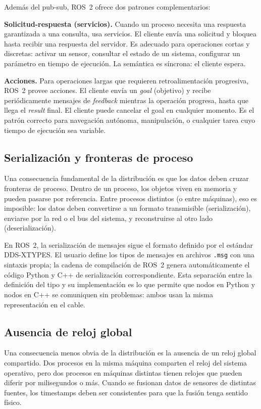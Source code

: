 Además del pub-sub, ROS~2 ofrece dos patrones complementarios:

\textbf{Solicitud-respuesta (servicios).} Cuando un proceso necesita una respuesta garantizada a una consulta, usa servicios. El cliente envía una solicitud y bloquea hasta recibir una respuesta del servidor. Es adecuado para operaciones cortas y discretas: activar un sensor, consultar el estado de un sistema, configurar un parámetro en tiempo de ejecución. La semántica es síncrona: el cliente espera.

\textbf{Acciones.} Para operaciones largas que requieren retroalimentación progresiva, ROS~2 provee acciones. El cliente envía un \textit{goal} (objetivo) y recibe periódicamente mensajes de \textit{feedback} mientras la operación progresa, hasta que llega el \textit{result} final. El cliente puede cancelar el goal en cualquier momento. Es el patrón correcto para navegación autónoma, manipulación, o cualquier tarea cuyo tiempo de ejecución sea variable.

\subsection{Serialización y fronteras de proceso}

Una consecuencia fundamental de la distribución es que los datos deben cruzar fronteras de proceso. Dentro de un proceso, los objetos viven en memoria y pueden pasarse por referencia. Entre procesos distintos (o entre máquinas), eso es imposible: los datos deben convertirse a un formato transmisible (serialización), enviarse por la red o el bus del sistema, y reconstruirse al otro lado (deserialización).

En ROS~2, la serialización de mensajes sigue el formato definido por el estándar DDS-XTYPES. El usuario define los tipos de mensajes en archivos \texttt{.msg} con una sintaxis propia; la cadena de compilación de ROS~2 genera automáticamente el código Python y C++ de serialización correspondiente. Esta separación entre la definición del tipo y su implementación es lo que permite que nodos en Python y nodos en C++ se comuniquen sin problemas: ambos usan la misma representación en el cable.

\subsection{Ausencia de reloj global}

Una consecuencia menos obvia de la distribución es la ausencia de un reloj global compartido. Dos procesos en la misma máquina comparten el reloj del sistema operativo, pero dos procesos en máquinas distintas tienen relojes que pueden diferir por milisegundos o más. Cuando se fusionan datos de sensores de distintas fuentes, los timestamps deben ser consistentes para que la fusión tenga sentido físico.

